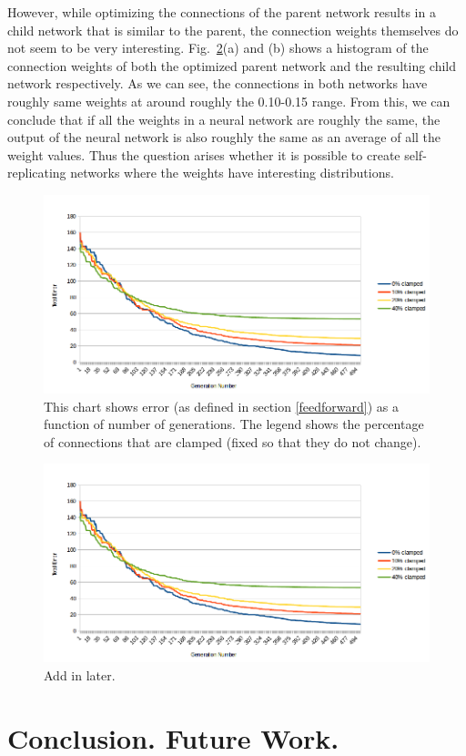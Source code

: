 \documentclass[12pt]{article}
\begin{document}
However, while optimizing the connections of the parent network results in a child network that is similar to the parent, the connection weights themselves do not seem to be very interesting. Fig.~\ref{histogram}(a) and (b) shows a histogram of the connection weights of both the optimized parent network and the resulting child network respectively. As we can see, the connections in both networks have roughly same weights at around roughly the 0.10-0.15 range. From this, we can conclude that if all the weights in a neural network are roughly the same, the output of the neural network is also roughly the same as an average of all the weight values. Thus the question arises whether it is possible to create self-replicating networks where the weights have interesting distributions. 

\begin{figure}[h]
\begin{center}
  \includegraphics[width=1.0\linewidth]{result1.png}
\end{center}
   \caption{This chart shows error (as defined in section \ref{feedforward}) as a function of number of generations. The legend shows the percentage of connections that are clamped (fixed so that they do not change).}
\label{result1}
\end{figure}

\begin{figure}[h]
\begin{center}
  \includegraphics[width=1.0\linewidth]{result1.png}
\end{center}
   \caption{Add in later.}
\label{histogram}
\end{figure}

\section{Conclusion. Future Work.}
\label{conclusion}

\renewcommand{\refname}{\section{References}}


\end{document}
